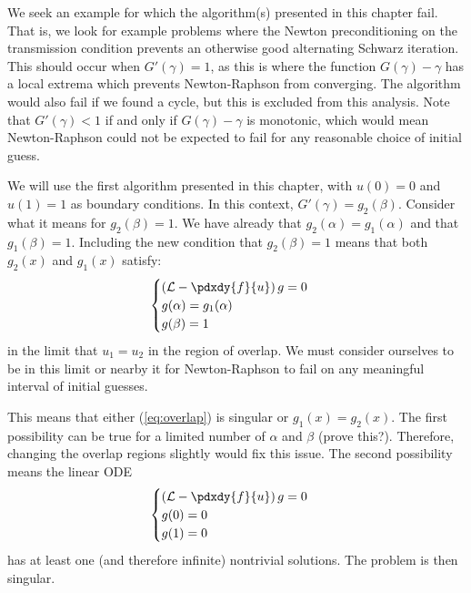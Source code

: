 \documentclass{book}
\begin{document}
We seek an example for which the algorithm(s) presented in this chapter fail.
That is, we look for example problems where the Newton preconditioning on the transmission condition prevents an otherwise good alternating Schwarz iteration.
This should occur when $G'(\gamma)=1$, as this is where the function $G(\gamma)-\gamma$ has a local extrema which prevents Newton-Raphson from converging.
The algorithm would also fail if we found a cycle, but this is excluded from this analysis.
Note that $G'(\gamma) < 1$ if and only if $G(\gamma) - \gamma$ is monotonic, which would mean Newton-Raphson could not be expected to fail for any reasonable choice of initial guess.

We will use the first algorithm presented in this chapter, with $u(0) = 0$ and $u(1) = 1$ as boundary conditions.
In this context, $G'(\gamma) = g_2(\beta)$.
Consider what it means for $g_2(\beta) = 1$.
We have already that $g_2(\alpha) = g_1(\alpha)$ and that $g_1(\beta) = 1$.
Including the new condition that $g_2(\beta) = 1$ means that both $g_2(x)$ and $g_1(x)$ satisfy:
\begin{equation}
\begin{cases} \left ( \mathcal{L} - \pdxdy{f}{u} \right ) g = 0 \\ g(\alpha) = g_1(\alpha) \\ g(\beta) = 1 \end{cases}
\label{eq:overlap}
\end{equation}
in the limit that $u_1 = u_2$ in the region of overlap.
We must consider ourselves to be in this limit or nearby it for Newton-Raphson to fail on any meaningful interval of initial guesses.

This means that either (\ref{eq:overlap}) is singular or $g_1(x) = g_2(x)$.
The first possibility can be true for a limited number of $\alpha$ and $\beta$ (prove this?).
Therefore, changing the overlap regions slightly would fix this issue.
The second possibility means the linear ODE
\begin{equation*}
\begin{cases} \left ( \mathcal{L} - \pdxdy{f}{u} \right ) g = 0 \\
g(0) = 0 \\ g(1) = 0 \end{cases}
\end{equation*}
has at least one (and therefore infinite) nontrivial solutions.
The problem is then singular.
\end{document}
